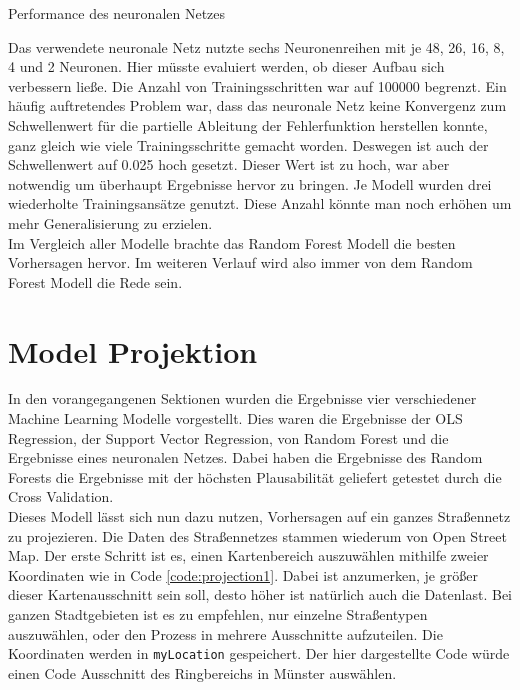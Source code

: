 \documentclass[a4paper,12pt]{thesis}
\begin{document}
\begin{table}
	\caption{Performance des neuronalen Netzes}
	\label{tbl:NN1}
\end{table}

Das verwendete neuronale Netz nutzte sechs Neuronenreihen mit je 48, 26, 16, 8, 4 und 2 Neuronen. Hier müsste evaluiert werden, ob dieser Aufbau sich verbessern ließe. Die Anzahl von Trainingsschritten war auf 100000 begrenzt. Ein häufig auftretendes Problem war, dass das neuronale Netz keine Konvergenz zum Schwellenwert für die partielle Ableitung der Fehlerfunktion herstellen konnte, ganz gleich wie viele Trainingsschritte gemacht worden. Deswegen ist auch der Schwellenwert auf 0.025 hoch gesetzt. Dieser Wert ist zu hoch, war aber notwendig um überhaupt Ergebnisse hervor zu bringen. Je Modell wurden drei wiederholte Trainingsansätze genutzt. Diese Anzahl könnte man noch erhöhen um mehr Generalisierung zu erzielen.\\
Im Vergleich aller Modelle brachte das Random Forest Modell die besten Vorhersagen hervor. Im weiteren Verlauf wird also immer von dem Random Forest Modell die Rede sein.

\section{Model Projektion}

In den vorangegangenen Sektionen wurden die Ergebnisse vier verschiedener Machine Learning Modelle vorgestellt. Dies waren die Ergebnisse der OLS Regression, der Support Vector Regression, von Random Forest und die Ergebnisse eines neuronalen Netzes. Dabei haben die Ergebnisse des Random Forests die Ergebnisse mit der höchsten Plausabilität geliefert getestet durch die Cross Validation.\\
Dieses Modell lässt sich nun dazu nutzen, Vorhersagen auf ein ganzes Straßennetz zu projezieren. Die Daten des Straßennetzes stammen wiederum von Open Street Map. Der erste Schritt ist es, einen Kartenbereich auszuwählen mithilfe zweier Koordinaten wie in Code \ref{code:projection1}. Dabei ist anzumerken, je größer dieser Kartenausschnitt sein soll, desto höher ist natürlich auch die Datenlast. Bei ganzen Stadtgebieten ist es zu empfehlen, nur einzelne Straßentypen auszuwählen, oder den Prozess in mehrere Ausschnitte aufzuteilen. Die Koordinaten werden in \lstinline|myLocation| gespeichert. Der hier dargestellte Code würde einen Code Ausschnitt des Ringbereichs in Münster auswählen.
\end{document}

